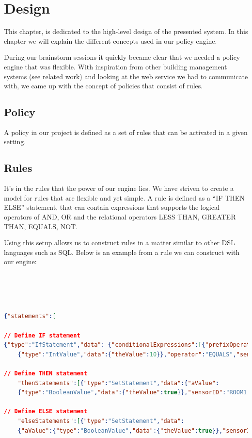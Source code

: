 \section{Design}
This chapter, is dedicated to the high-level design of the presented system. In this chapter we will explain the different concepts used in our policy engine. 

During our brainstorm sessions it quickly became clear that we needed a policy engine that was flexible. With inspiration from other building management systems (see related work) and looking at the web service we had to communicate with, we came up with the concept of policies that consist of rules.

\subsection{Policy}
A policy in our project is defined as a set of rules that can be activated in a given setting.

\subsection{Rules}
It's in the rules that the power of our engine lies. We have striven to create a model for rules that are flexible and yet simple. A rule is defined as a "`IF THEN ELSE"' statement, that can contain expressions that supports the logical operators of AND, OR and the relational operators LESS THAN, GREATER THAN, EQUALS, NOT. 

Using this setup allows us to construct rules in a matter similar to other DSL languages such as SQL. Below is an example from a rule we can construct with our engine:
\\
\\
\\
\\
\\
\begin{lstlisting}[language=json,firstnumber=1]
{"statements":[

// Define IF statement
{"type":"IfStatement","data": {"conditionalExpressions":[{"prefixOperator":"AND","aValue":
	{"type":"IntValue","data":{"theValue":10}},"operator":"EQUALS","sensorId":"ROOM1.TEMPERATURE"}],

// Define THEN statement	
	"thenStatements":[{"type":"SetStatement","data":{"aValue":
	{"type":"BooleanValue","data":{"theValue":true}},"sensorID":"ROOM1.HEATER"}}],

// Define ELSE statement
	"elseStatements":[{"type":"SetStatement","data":
	{"aValue":{"type":"BooleanValue","data":{"theValue":true}},"sensorID":"ROOM1.BLINDS"}}]}}]}
\end{lstlisting}

